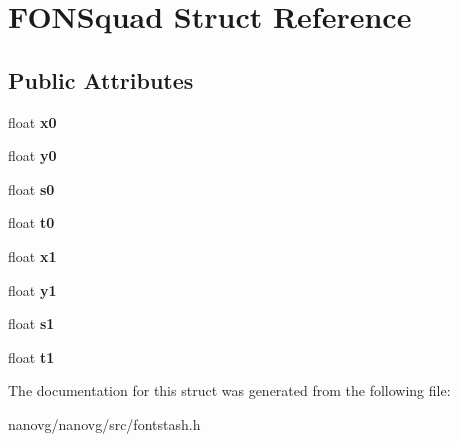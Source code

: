 \hypertarget{struct_f_o_n_squad}{\section{F\+O\+N\+Squad Struct Reference}
\label{struct_f_o_n_squad}
}
\subsection*{Public Attributes}
\begin{DoxyCompactItemize}
\item 
\hypertarget{struct_f_o_n_squad_a3afad57cffbd1350a09f208c631a9813}{float {\bfseries x0}}\label{struct_f_o_n_squad_a3afad57cffbd1350a09f208c631a9813}

\item 
\hypertarget{struct_f_o_n_squad_af92a5d58d387d08575a149b3869ad994}{float {\bfseries y0}}\label{struct_f_o_n_squad_af92a5d58d387d08575a149b3869ad994}

\item 
\hypertarget{struct_f_o_n_squad_a3adfc2773c508cc686564474faa32491}{float {\bfseries s0}}\label{struct_f_o_n_squad_a3adfc2773c508cc686564474faa32491}

\item 
\hypertarget{struct_f_o_n_squad_ab9a0182a9c2d25c165f11fffeb56b130}{float {\bfseries t0}}\label{struct_f_o_n_squad_ab9a0182a9c2d25c165f11fffeb56b130}

\item 
\hypertarget{struct_f_o_n_squad_a6db320ddee76b1f2fefcb2c6b31b525d}{float {\bfseries x1}}\label{struct_f_o_n_squad_a6db320ddee76b1f2fefcb2c6b31b525d}

\item 
\hypertarget{struct_f_o_n_squad_a7d11aed083800fc600fa2b736c7eb973}{float {\bfseries y1}}\label{struct_f_o_n_squad_a7d11aed083800fc600fa2b736c7eb973}

\item 
\hypertarget{struct_f_o_n_squad_a25bd9940964ba17228ad1eea3f305c46}{float {\bfseries s1}}\label{struct_f_o_n_squad_a25bd9940964ba17228ad1eea3f305c46}

\item 
\hypertarget{struct_f_o_n_squad_ab3c79f5439b37cf9c1eafa6d4f623ad9}{float {\bfseries t1}}\label{struct_f_o_n_squad_ab3c79f5439b37cf9c1eafa6d4f623ad9}

\end{DoxyCompactItemize}


The documentation for this struct was generated from the following file\+:\begin{DoxyCompactItemize}
\item 
nanovg/nanovg/src/fontstash.\+h\end{DoxyCompactItemize}
